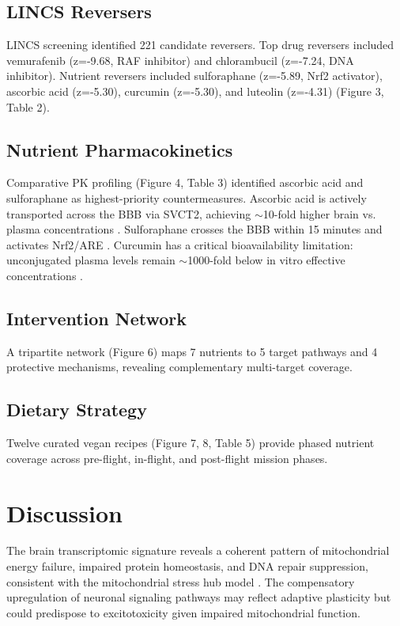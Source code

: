 \documentclass[11pt,a4paper]{article}
\begin{document}
\subsection{LINCS Reversers}
LINCS screening identified 221 candidate reversers. Top drug reversers included vemurafenib (z=-9.68, RAF inhibitor) and chlorambucil (z=-7.24, DNA inhibitor). Nutrient reversers included sulforaphane (z=-5.89, Nrf2 activator), ascorbic acid (z=-5.30), curcumin (z=-5.30), and luteolin (z=-4.31) (Figure 3, Table 2).

\subsection{Nutrient Pharmacokinetics}
Comparative PK profiling (Figure 4, Table 3) identified ascorbic acid and sulforaphane as highest-priority countermeasures. Ascorbic acid is actively transported across the BBB via SVCT2, achieving $\sim$10-fold higher brain vs. plasma concentrations \citep{Hoffer2020}. Sulforaphane crosses the BBB within 15 minutes and activates Nrf2/ARE \citep{Zheng2022}. Curcumin has a critical bioavailability limitation: unconjugated plasma levels remain $\sim$1000-fold below in vitro effective concentrations \citep{Kroon2025}.

\subsection{Intervention Network}
A tripartite network (Figure 6) maps 7 nutrients to 5 target pathways and 4 protective mechanisms, revealing complementary multi-target coverage.

\subsection{Dietary Strategy}
Twelve curated vegan recipes (Figure 7, 8, Table 5) provide phased nutrient coverage across pre-flight, in-flight, and post-flight mission phases.

\section{Discussion}
The brain transcriptomic signature reveals a coherent pattern of mitochondrial energy failure, impaired protein homeostasis, and DNA repair suppression, consistent with the mitochondrial stress hub model \citep{daSilveira2020,Afshinnekoo2020}. The compensatory upregulation of neuronal signaling pathways may reflect adaptive plasticity but could predispose to excitotoxicity given impaired mitochondrial function.
\end{document}
